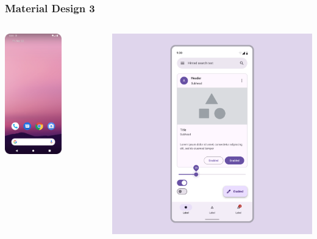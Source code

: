 \documentclass[12pt]{beamer}
\begin{document}
    \begin{frame}
        \frametitle{Material Design 3}
        \begin{columns}
            \begin{column}{0.5\textwidth}
                \includegraphics[width=0.6\textwidth]{android-12-0.png}
            \end{column}
            \begin{column}{0.5\textwidth}
                \includegraphics[width=1\textwidth]{md-3.png}

\end{column}
\end{columns}
\end{frame}
\end{document}
